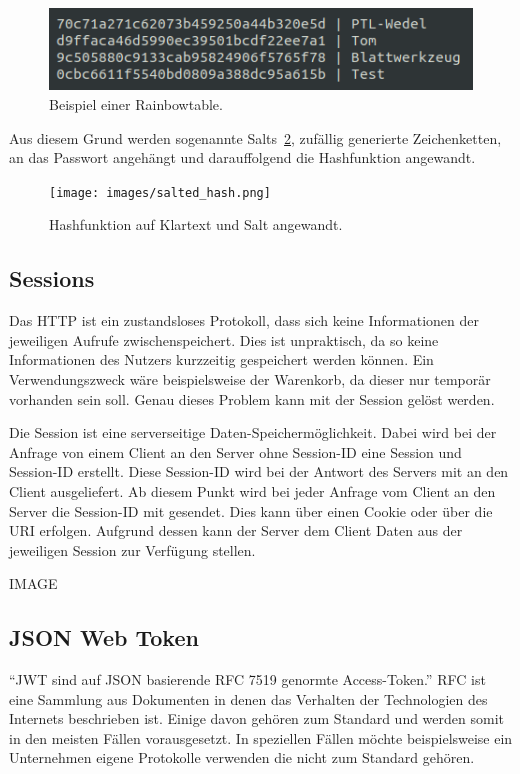 \documentclass[11pt]{article}
\begin{document}
	\begin{figure}[h]
		\includegraphics[width=\textwidth]{images/rainbowtable.png}
		\caption{Beispiel einer Rainbowtable.}
		\label{fig:rainbowtable}
	\end{figure}
	
	Aus diesem Grund werden sogenannte Salts~\ref{fig:salted-hash}, zufällig generierte Zeichenketten, an das Passwort angehängt und darauffolgend die Hashfunktion angewandt.

	\begin{figure}[h]
		\texttt{[image: images/salted\_hash.png]}
		\caption{Hashfunktion auf Klartext und Salt angewandt.}
		\label{fig:salted-hash}
	\end{figure}
		
	\subsection{Sessions}
	\label{sec: sessions}
	
	Das \gls{HTTP} ist ein zustandsloses Protokoll, dass sich keine Informationen der jeweiligen Aufrufe zwischenspeichert. Dies ist unpraktisch, da so keine Informationen des Nutzers kurzzeitig gespeichert werden können. Ein Verwendungszweck wäre beispielsweise der Warenkorb, da dieser nur temporär vorhanden sein soll. Genau dieses Problem kann mit der Session gelöst werden.
	
	Die Session ist eine serverseitige Daten-Speichermöglichkeit. Dabei wird bei der Anfrage von einem Client an den Server ohne Session-ID eine Session und Session-ID erstellt. Diese Session-ID wird bei der Antwort des Servers mit an den Client ausgeliefert. Ab diesem Punkt wird bei jeder Anfrage vom Client an den Server die Session-ID mit gesendet. Dies kann über einen Cookie oder über die \gls{URI} erfolgen. Aufgrund dessen kann der Server dem Client Daten aus der jeweiligen Session zur Verfügung stellen.
	
	IMAGE
	
	\subsection{JSON Web Token}
	\label{sec: jwt}
	\enquote{\gls{JWT} sind auf \gls{JSON} basierende \gls{RFC} 7519 genormte Access-Token.} \gls{RFC} ist eine Sammlung aus Dokumenten in denen das Verhalten der Technologien des Internets beschrieben ist. Einige davon gehören zum Standard und werden somit in den meisten Fällen vorausgesetzt. In speziellen Fällen möchte beispielsweise ein Unternehmen eigene Protokolle verwenden die nicht zum Standard gehören. 
	
\end{document}
